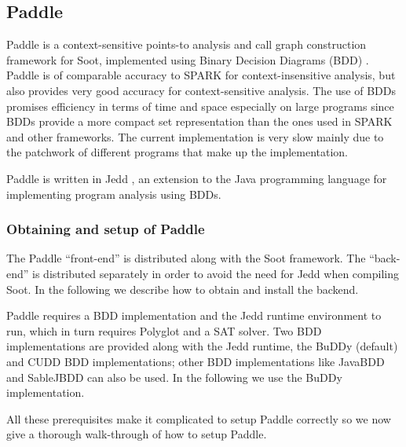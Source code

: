 \documentclass{article}
\begin{document}
\subsection{Paddle}
Paddle is a context-sensitive points-to analysis and call graph
construction framework for Soot, implemented using Binary
Decision Diagrams (BDD) \cite{bern.lhot.ea03}. Paddle is of comparable
accuracy to SPARK for context-insensitive analysis, but also provides
very good accuracy for context-sensitive analysis. The use of BDDs
promises efficiency in terms of time and space especially on large
programs \cite{bern.lhot.ea03} since BDDs provide a more compact set
representation than the ones used in SPARK and other frameworks. The
current implementation is very slow mainly due to the patchwork of
different programs that make up the implementation.

Paddle is written in Jedd \cite{jedd}, an extension to the Java
programming language for implementing program analysis using BDDs.

\subsubsection*{Obtaining and setup of Paddle}
The Paddle ``front-end'' is distributed along with the Soot
framework. The ``back-end'' is distributed separately in order to
avoid the need for Jedd when compiling Soot. In the following we
describe how to obtain and install the backend.

Paddle requires a BDD implementation and the Jedd runtime environment
to run, which in turn requires Polyglot and a SAT solver. Two BDD
implementations are provided along with the Jedd runtime, the
BuDDy (default) and CUDD BDD implementations; other BDD implementations
like JavaBDD and SableJBDD can also be used. In the following we use
the BuDDy implementation.

All these prerequisites make it complicated to setup Paddle correctly
so we now give a thorough walk-through of how to setup Paddle.
\end{document}
